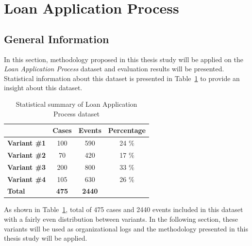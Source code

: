 \section{Loan Application Process}
\label{sec:loan-app-process}

\subsection{General Information}
\label{sec:loan-app-information}

In this section, methodology proposed in this thesis study will be applied on the \textit{Loan Application Process} dataset \cite{loan-app-data} and evaluation results will be presented. Statistical information about this dataset is presented in Table~\ref{table:loan-app-process-summary} to provide an insight about this dataset.
\begin{table}[]
\centering
\caption{Statistical summary of Loan Application Process dataset}
\label{table:loan-app-process-summary}
\begin{tabular}{@{}lccc@{}}
\toprule
                  & {\bf Cases} & {\bf Events} & {\bf Percentage} \\ \midrule
{\bf Variant \#1} & 100         & 590          & 24 \%            \\ \midrule
{\bf Variant \#2} & 70          & 420          & 17 \%            \\ \midrule
{\bf Variant \#3} & 200         & 800          & 33 \%            \\ \midrule
{\bf Variant \#4} & 105         & 630          & 26 \%            \\ \midrule
{\bf Total}       & {\bf 475}   & {\bf 2440}   & {\bf }           \\ \bottomrule
\end{tabular}
\end{table}

As shown in Table~\ref{table:loan-app-process-summary}, total of 475 cases and 2440 events included in this dataset with a fairly even distribution between variants. In the following section, these variants will be used as organizational logs and the methodology presented in this thesis study will be applied.

